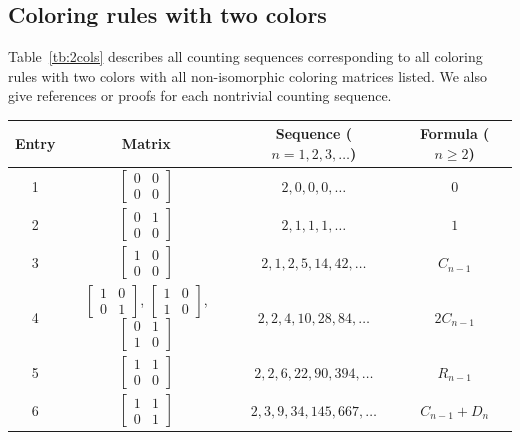 \documentclass[12pt]{amsart}
\begin{document}
\subsection{Coloring rules with two colors}\label{ss:2by2}
Table~\ref{tb:2cols} describes all counting sequences corresponding to all coloring rules with two colors with all non-isomorphic coloring matrices listed. We also give references or proofs for each nontrivial counting sequence. 
\begin{table}[htbp]
    \setlength{\tabcolsep}{0.25em}
    \begin{tabular}{ | c | c | c | c | } 
  \hline
   Entry & Matrix & Sequence ($n = 1, 2,3,\ldots$) & Formula ($n\geq2$)\\
  \hline
  1 & $\begin{bmatrix}
0 & 0 \\
0 & 0 
\end{bmatrix}$ & $2,0,0,0,\ldots$ & $0$ \\
\hline
  2 & $\begin{bmatrix}
0 & 1 \\
0 & 0 
\end{bmatrix}$ & $2,1,1,1,\ldots$ & $1$ \\
  \hline
  3 & $\begin{bmatrix}
1 & 0 \\
0 & 0 
\end{bmatrix}$ & $2, 1, 2, 5, 14, 42, \ldots$ & 
$C_{n-1}$\\
  \hline
  4 & $\begin{bmatrix}
1 & 0 \\
0 & 1 
\end{bmatrix}$, $\begin{bmatrix}
1 & 0 \\
1 & 0 
\end{bmatrix}$, $\begin{bmatrix}
0 & 1 \\
1 & 0 
\end{bmatrix}$ & $2, 2, 4, 10, 28, 84, \ldots$ & $2C_{n-1}$ \\ 
  \hline
  5 & $\begin{bmatrix}
1 & 1 \\
0 & 0 
\end{bmatrix}$ & $2, 2,6,22,90, 394, \ldots$ & 
$R_{n-1}$ \\
\hline
6 & $\begin{bmatrix}
1 & 1 \\
0 & 1 
\end{bmatrix}$ & $2, 3, 9,34,145, 667, \ldots$ & $C_{n-1} + D_{n}$  \\

\end{tabular}
\end{table}
\end{document}
